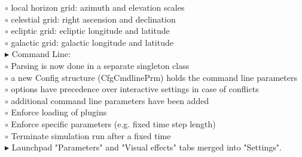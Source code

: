 \documentclass[Orbiter User Manual.tex]{subfiles}
\begin{document}
\begin{sloppypar}
$\circ$ local horizon grid: azimuth and elevation scales\\
$\circ$ celestial grid: right ascension and declination\\
$\circ$ ecliptic grid: ecliptic longitude and latitude\\
$\circ$ galactic grid: galactic longitude and latitude\\
$\blacktriangleright$ Command Line:\\
$\circ$ Parsing is now done in a separate singleton class\\
$\circ$ a new Config structure (CfgCmdlinePrm) holds the command line parameters\\
$\circ$ options have precedence over interactive settings in case of conflicts\\
$\circ$ additional command line parameters have been added\\
$\circ$ Enforce loading of plugins\\
$\circ$ Enforce specific parameters (e.g. fixed time step length)\\
$\circ$ Terminate simulation run after a fixed time\\
$\blacktriangleright$ Launchpad "Parameters" and "Visual effects" tabs merged into "Settings".\\
\end{sloppypar}
\end{document}

